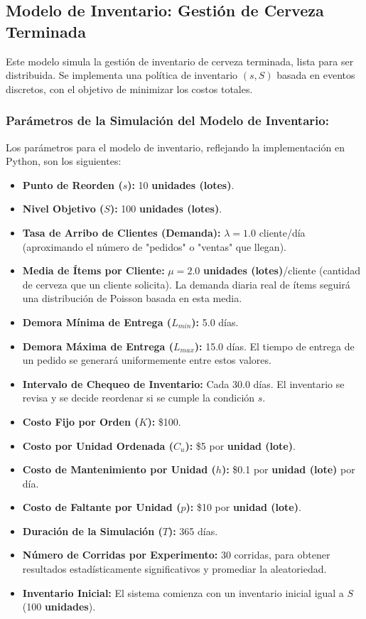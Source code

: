 \documentclass{article}
\begin{document}
\subsection{Modelo de Inventario: Gestión de Cerveza Terminada}
Este modelo simula la gestión de inventario de cerveza terminada, lista para ser distribuida. Se implementa una política de inventario $(s,S)$ basada en eventos discretos, con el objetivo de minimizar los costos totales.


\subsubsection{Parámetros de la Simulación del Modelo de Inventario:}
Los parámetros para el modelo de inventario, reflejando la implementación en Python, son los siguientes:
\begin{itemize}
    \item \textbf{Punto de Reorden ($s$):} 10 \textbf{unidades (lotes)}.
    \item \textbf{Nivel Objetivo ($S$):} 100 \textbf{unidades (lotes)}.
    \item \textbf{Tasa de Arribo de Clientes (Demanda):} $\lambda = 1.0$ cliente/día (aproximando el número de "pedidos" o "ventas" que llegan).
    \item \textbf{Media de Ítems por Cliente:} $\mu = 2.0$ \textbf{unidades (lotes)}/cliente (cantidad de cerveza que un cliente solicita). La demanda diaria real de ítems seguirá una distribución de Poisson basada en esta media.
    \item \textbf{Demora Mínima de Entrega ($L_{min}$):} 5.0 días.
    \item \textbf{Demora Máxima de Entrega ($L_{max}$):} 15.0 días. El tiempo de entrega de un pedido se generará uniformemente entre estos valores.
    \item \textbf{Intervalo de Chequeo de Inventario:} Cada 30.0 días. El inventario se revisa y se decide reordenar si se cumple la condición $s$.
    \item \textbf{Costo Fijo por Orden ($K$):} \$100.
    \item \textbf{Costo por Unidad Ordenada ($C_u$):} \$5 por \textbf{unidad (lote)}.
    \item \textbf{Costo de Mantenimiento por Unidad ($h$):} \$0.1 por \textbf{unidad (lote)} por día.
    \item \textbf{Costo de Faltante por Unidad ($p$):} \$10 por \textbf{unidad (lote)}.
    \item \textbf{Duración de la Simulación ($T$):} 365 días.
    \item \textbf{Número de Corridas por Experimento:} 30 corridas, para obtener resultados estadísticamente significativos y promediar la aleatoriedad.
    \item \textbf{Inventario Inicial:} El sistema comienza con un inventario inicial igual a $S$ (100 \textbf{unidades}).
\end{itemize}
\end{document}

